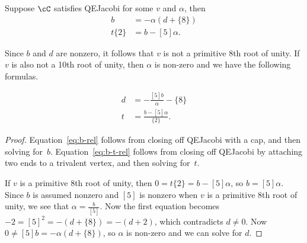 \documentclass[12pt]{amsart}
\begin{document}
\begin{lemma}
Suppose $\cC$ satisfies QEJacobi for some $v$ and $\alpha$, then 
\begin{align*}
  [5] b &= - \alpha (d+\{8\}) \\
  t \{2\} &= b-[5] \alpha.
\end{align*}

Since $b$ and $d$ are nonzero, it follows that $v$ is not a primitive $8$th root of unity.  If $v$ is also not a 10th root of unity, then $\alpha$ is non-zero and we have the following formulas.

\begin{align*}
  d &= -\frac{[5] b}{\alpha} - \{8\}   \\
  t  &= \frac{b-[5] \alpha}{\{2\}}.
\end{align*}
\end{lemma}
\begin{proof}
 Equation~\eqref{eq:b-rel} follows
  from closing off QEJacobi with a cap, and
  then solving for~$b$. Equation~\eqref{eq:b-t-rel} follows from
  closing off QEJacobi by attaching two ends
  to a trivalent vertex, and then solving for~$t$.
  
  If $v$ is a primitive $8$th root of unity, then $0 = t \{2\} = b-[5] \alpha$, so $b = [5] \alpha$.  Since $b$ is assumed nonzero and $[5]$ is nonzero when $v$ is a primitive $8$th root of unity, we see that $\alpha = \frac{b}{[5]}$.  Now the first equation becomes $-2 = [5]^2 = -(d+\{8\})=-(d+2)$, which contradicts $d \neq 0$.  
  Now $0 \neq [5] b = - \alpha (d+\{8\})$, so $\alpha$ is non-zero and we can solve for $d$.
\end{proof}
\end{document}
